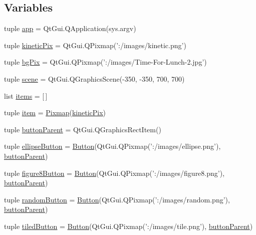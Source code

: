 \subsection*{Variables}
\begin{DoxyCompactItemize}
\item 
tuple \hyperlink{namespaceanimatedtiles_a7d7f82317a4c306c58e1ea877a49be3a}{app} = Qt\+Gui.\+Q\+Application(sys.\+argv)
\item 
tuple \hyperlink{namespaceanimatedtiles_ab2a52301f69dcbb22be5912ba2d32b4f}{kinetic\+Pix} = Qt\+Gui.\+Q\+Pixmap('\+:/images/kinetic.\+png')
\item 
tuple \hyperlink{namespaceanimatedtiles_a00862f57ff9083ab1bba3be8f457fbb0}{bg\+Pix} = Qt\+Gui.\+Q\+Pixmap('\+:/images/Time-\/For-\/Lunch-\/2.jpg')
\item 
tuple \hyperlink{namespaceanimatedtiles_aeca35dab2ca795f6e6dabf76a4797ef0}{scene} = Qt\+Gui.\+Q\+Graphics\+Scene(-\/350, -\/350, 700, 700)
\item 
list \hyperlink{namespaceanimatedtiles_a393cbd8d3e82651595f25a84b1883af5}{items} = \mbox{[}$\,$\mbox{]}
\item 
tuple \hyperlink{namespaceanimatedtiles_ac9261de1a75e3315cb038f63544756d0}{item} = \hyperlink{classanimatedtiles_1_1Pixmap}{Pixmap}(\hyperlink{namespaceanimatedtiles_ab2a52301f69dcbb22be5912ba2d32b4f}{kinetic\+Pix})
\item 
tuple \hyperlink{namespaceanimatedtiles_aa63235906027ecca5b15b81876f430a5}{button\+Parent} = Qt\+Gui.\+Q\+Graphics\+Rect\+Item()
\item 
tuple \hyperlink{namespaceanimatedtiles_ae9dbcba2b943c792e520691ff1e8915b}{ellipse\+Button} = \hyperlink{classanimatedtiles_1_1Button}{Button}(Qt\+Gui.\+Q\+Pixmap('\+:/images/ellipse.\+png'), \hyperlink{namespaceanimatedtiles_aa63235906027ecca5b15b81876f430a5}{button\+Parent})
\item 
tuple \hyperlink{namespaceanimatedtiles_aa14f616cce5bc55fa4986ff9302aa5a1}{figure8\+Button} = \hyperlink{classanimatedtiles_1_1Button}{Button}(Qt\+Gui.\+Q\+Pixmap('\+:/images/figure8.\+png'), \hyperlink{namespaceanimatedtiles_aa63235906027ecca5b15b81876f430a5}{button\+Parent})
\item 
tuple \hyperlink{namespaceanimatedtiles_ac89ca6d7bc45ebf366615df1e4cc7540}{random\+Button} = \hyperlink{classanimatedtiles_1_1Button}{Button}(Qt\+Gui.\+Q\+Pixmap('\+:/images/random.\+png'), \hyperlink{namespaceanimatedtiles_aa63235906027ecca5b15b81876f430a5}{button\+Parent})
\item 
tuple \hyperlink{namespaceanimatedtiles_abb2947b32ad817e5c844b47f587e6b3f}{tiled\+Button} = \hyperlink{classanimatedtiles_1_1Button}{Button}(Qt\+Gui.\+Q\+Pixmap('\+:/images/tile.\+png'), \hyperlink{namespaceanimatedtiles_aa63235906027ecca5b15b81876f430a5}{button\+Parent})

\end{DoxyCompactItemize}
